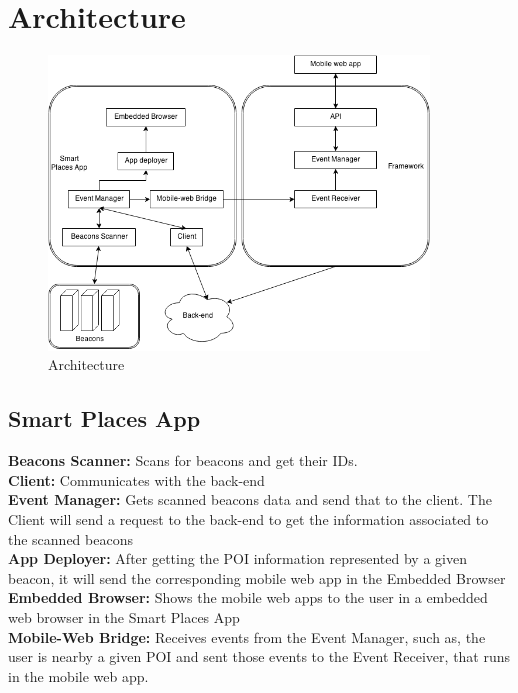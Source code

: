 
% 
% 

\section{Architecture}
\label{sec:architecture}
\begin{figure}[!ht]
  \caption{Architecture}
  \label{fig:architecture}
  \centering
    \includegraphics[width=0.9\textwidth]{img/architecture}
\end{figure}

\subsection{Smart Places App}
\label{sub:smart_places_app}
\textbf{Beacons Scanner:} 
Scans for beacons and get their IDs.
\\
\textbf{Client:} 
Communicates with the back-end
\\
\textbf{Event Manager:} 
Gets scanned beacons data and send that to the client.
The Client will send a request to the back-end to get the
information associated to the scanned beacons
\\
\textbf{App Deployer:} 
After getting the POI information represented by a given beacon,
it will send the corresponding mobile web app in the Embedded
Browser
\\
\textbf{Embedded Browser:} 
Shows the mobile web apps to the user in a embedded web browser
in the Smart Places App
\\
\textbf{Mobile-Web Bridge:} 
Receives events from the Event Manager, such as, the user
is nearby a given POI and sent those events to the Event Receiver,
that runs in the mobile web app.
\\

